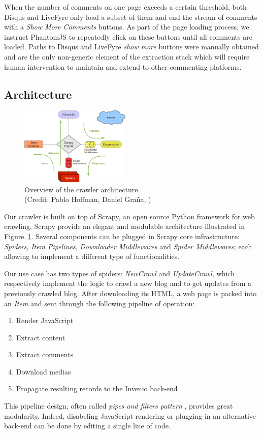 When the number of comments on one page exceeds a certain threshold, both Disqus and LiveFyre only load a subset of them and end the stream of comments with a \emph{Show More Comments} buttons. As part of the page loading process, we instruct PhantomJS to repeatedly click on these buttons until all comments are loaded. Paths to Disqus and LiveFyre \emph{show more} buttons were manually obtained and are the only non-generic element of the extraction stack which will require human intervention to maintain and extend to other commenting platforms.


\subsection{Architecture}

\begin{figure}
  \capstart
  \centering
  \includegraphics[width=0.47\textwidth]{img/scrapy_architecture.png}
  \caption{Overview of the crawler architecture.\\(Credit: Pablo Hoffman, Daniel Graña, \cite{scrapy2013})}
  \label{architecture}
\end{figure}

Our crawler is built on top of Scrapy\cite{scrapy2013}, an open source Python framework for web crawling. Scrapy provide an elegant and modulable architecture illustrated in Figure~\ref{architecture}. Several components can be plugged in Scrapy core infrastructure: \emph{Spiders}, \emph{Item Pipelines}, \emph{Downloader Middlewares} and \emph{Spider Middlewares}; each allowing to implement a different type of functionalities.

Our use case has two types of spiders: \emph{NewCrawl} and \emph{UpdateCrawl}, which respectively implement the logic to crawl a new blog and to get updates from a previously crawled blog. After downloading its HTML, a web page is packed into an \emph{Item} and sent through the following pipeline of operation:
\begin{enumerate}[noitemsep]
  \item Render JavaScript
  \item Extract content
  \item Extract comments
  \item Download medias
  \item Propagate resulting records to the Invenio back-end
\end{enumerate}
This pipeline design, often called \emph{pipes and filters pattern} \cite[Chapter Messaging Systems]{hohpe2003}, provides great modularity. Indeed, disabeling JavaScript rendering or plugging in an alternative back-end can be done by editing a single line of code.


